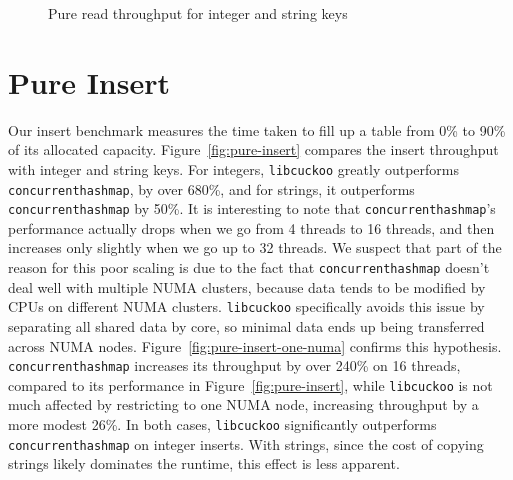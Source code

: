 \documentclass{article}
\newcommand{\tbbmap}{\texttt{concurrent\textunderscore hash\textunderscore map}}
\newcommand{\libcuckoo}{\texttt{libcuckoo}}
\begin{document}
\begin{figure}[!htbp]
  \centering
  \caption{Pure read throughput for integer and string keys}
  \label{fig:pure-read}
\end{figure}

\section*{Pure Insert}
Our insert benchmark measures the time taken to fill up a table from 0\% to 90\%
of its allocated capacity. Figure~\ref{fig:pure-insert} compares the insert
throughput with integer and string keys. For integers, {\libcuckoo} greatly
outperforms {\tbbmap}, by over 680\%, and for strings, it outperforms {\tbbmap}
by 50\%. It is interesting to note that {\tbbmap}'s performance actually drops
when we go from 4 threads to 16 threads, and then increases only slightly when
we go up to 32 threads. We suspect that part of the reason for this poor scaling
is due to the fact that {\tbbmap} doesn't deal well with multiple NUMA clusters,
because data tends to be modified by CPUs on different NUMA clusters.
{\libcuckoo} specifically avoids this issue by separating all shared data by
core, so minimal data ends up being transferred across NUMA nodes.
Figure~\ref{fig:pure-insert-one-numa} confirms this hypothesis. {\tbbmap}
increases its throughput by over 240\% on 16 threads, compared to its
performance in Figure~\ref{fig:pure-insert}, while {\libcuckoo} is not much
affected by restricting to one NUMA node, increasing throughput by a more modest
26\%. In both cases, {\libcuckoo} significantly outperforms {\tbbmap} on integer
inserts. With strings, since the cost of copying strings likely dominates the
runtime, this effect is less apparent.
\end{document}
